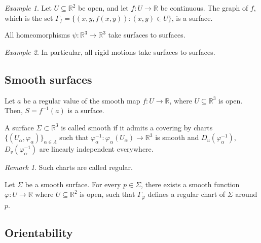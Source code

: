 \documentclass[11pt]{article}
\newcommand{\R}{\mathbb{R}}
\theoremstyle{definition}
\theoremstyle{remark}
\newtheorem*{remark}{Remark}
\newtheorem*{example}{Example}
\numberwithin{equation}{section}
\begin{document}
    \begin{example}
        Let $U\subseteq \R^2$ be open, and let $f\colon U \to \R$ be continuous. The
        graph of $f$, which is the set $\Gamma_f = \{(x, y, f(x, y)): (x, y) \in
        U\}$, is a surface.
    \end{example}

    \begin{lemma}
        All homeomorphisms $\psi\colon \R^3 \to \R^3$ take surfaces to surfaces.
    \end{lemma}
    \begin{example}
        In particular, all rigid motions take surfaces to surfaces.
    \end{example}


    \subsection{Smooth surfaces}    

    \begin{theorem}
        Let $a$ be a regular value of the smooth map $f\colon U \to \R$, where
        $U\subseteq \R^3$ is open. Then, $S = f^{-1}(a)$ is a surface.
    \end{theorem}

    \begin{definition}
        A surface $\Sigma \subset \R^3$ is called smooth if it admits a covering by
        charts $\{(U_\alpha, \varphi_\alpha)\}_{\alpha \in \Lambda}$ such that
        $\varphi_\alpha^{-1}\colon \varphi_\alpha(U_\alpha) \to \R^3$ is smooth and
        $D_u(\varphi_\alpha^{-1})$, $D_v(\varphi_\alpha^{-1})$ are linearly
        independent everywhere.
        \begin{remark}
            Such charts are called regular.
        \end{remark}
    \end{definition}

    \begin{lemma}
        Let $\Sigma$ be a smooth surface. For every $p \in \Sigma$, there exists a
        smooth function $\varphi\colon U \to \R$ where $U\subseteq \R^2$ is open,
        such that $\Gamma_\varphi$ defines a regular chart of $\Sigma$ around $p$.
    \end{lemma}
    

    \subsection{Orientability}
    
\end{document}
